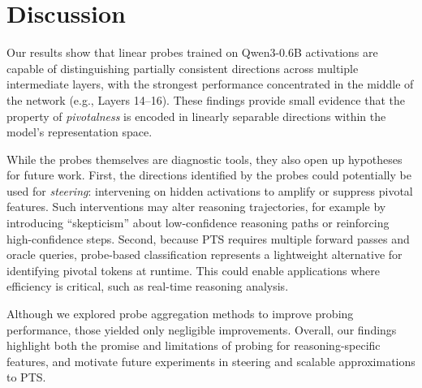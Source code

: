 \documentclass[11pt]{article}
\begin{document}
\begin{table}[h]
\centering
\setlength{\tabcolsep}{2pt}
\renewcommand{\arraystretch}{1.3}

\caption{Performance metrics for top 4 layers and average scores across all layers. The best value in each metric column is bolded.}
\label{tab:layer-performance}
\end{table}

\section{Discussion}

Our results show that linear probes trained on Qwen3-0.6B activations are capable of distinguishing partially consistent directions across multiple intermediate layers, with the strongest performance concentrated in the middle of the network (e.g., Layers 14–16). These findings provide small evidence that the property of \textit{pivotalness} is encoded in linearly separable directions within the model’s representation space. 

While the probes themselves are diagnostic tools, they also open up hypotheses for future work. First, the directions identified by the probes could potentially be used for \textit{steering}: intervening on hidden activations to amplify or suppress pivotal features. Such interventions may alter reasoning trajectories, for example by introducing “skepticism” about low-confidence reasoning paths or reinforcing high-confidence steps. Second, because PTS requires multiple forward passes and oracle queries, probe-based classification represents a lightweight alternative for identifying pivotal tokens at runtime. This could enable applications where efficiency is critical, such as real-time reasoning analysis. 

Although we explored probe aggregation methods to improve probing performance, those yielded only negligible improvements. Overall, our findings highlight both the promise and limitations of probing for reasoning-specific features, and motivate future experiments in steering and scalable approximations to PTS.

\nocite{*} 


\end{document}
